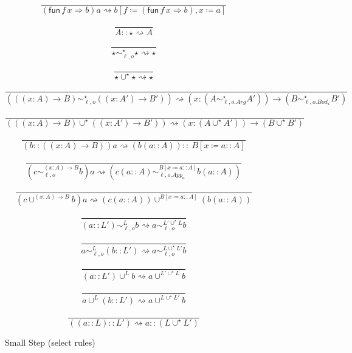 \begin{figure}
\[
\frac{\ }{\left(\mathsf{fun}\,f\,x\Rightarrow b\right)a\rightsquigarrow b\left[f\coloneqq\left(\mathsf{fun}\,f\,x\Rightarrow b\right),x\coloneqq a\right]}
\]

\[
\frac{\ }{A::\star\rightsquigarrow A}
\]

\[
\frac{\ }{\star\sim_{\ell,o}^{\star}\star\rightsquigarrow\star}
\]

\[
\frac{\ }{\star\cup^{\star}\star\rightsquigarrow\star}
\]

\[
\frac{\ }{\left(\left(\left(x:A\right)\rightarrow B\right)\sim_{\ell,o}^{\star}\left(\left(x:A'\right)\rightarrow B'\right)\right)\rightsquigarrow\left(x:\left(A\sim_{\ell,o.Arg}^{\star}A'\right)\right)\rightarrow\left(B\sim_{\ell,o.Bod_{x}}^{\star}B'\right)}
\]

\[
\frac{\ }{\left(\left(\left(x:A\right)\rightarrow B\right)\cup^{\star}\left(\left(x:A'\right)\rightarrow B'\right)\right)\rightsquigarrow\left(x:\left(A\cup^{\star}A'\right)\right)\rightarrow\left(B\cup^{\star}B'\right)}
\]

\[
\frac{\ }{\left(b::\left(\left(x:A\right)\rightarrow B\right)\right)a\rightsquigarrow\left(b\left(a::A\right)\right)::\ B\left[x\coloneqq a::A\right]}
\]

\[
\frac{\ }{\left(c\sim_{\ell,o}^{\left(x:A\right)\rightarrow B}b\right)a\rightsquigarrow\left(c\left(a::A\right)\sim_{\ell,o.App_{a}}^{B\left[x\coloneqq a::A\right]}b\left(a::A\right)\right)}
\]

\[
\frac{\ }{\left(c\cup^{\left(x:A\right)\rightarrow B}b\right)a\rightsquigarrow\left(c\left(a::A\right)\right)\cup^{B\left[x\coloneqq a::A\right]}\left(b\left(a::A\right)\right)}
\]

\[
\frac{\ }{\left(a::L'\right)\sim_{\ell,o}^{L}b\rightsquigarrow a\sim_{\ell,o}^{L'\cup^{\star}L}b}
\]

\[
\frac{\ }{a\sim_{\ell,o}^{L}\left(b::L'\right)\rightsquigarrow a\sim_{\ell,o}^{L\cup^{\star}L'}b}
\]

\[
\frac{\ }{\left(a::L'\right)\cup^{L}b\rightsquigarrow a\cup^{L'\cup^{\star}L}b}
\]

\[
\frac{\ }{a\cup^{L}\left(b::L'\right)\rightsquigarrow a\cup^{L\cup^{\star}L'}b}
\]

\[
\frac{\ }{\left(\left(a::L\right)::L'\right)\rightsquigarrow a::\left(L\cup^{\star}L'\right)}
\]
\caption{\CLang{} Small Step (select rules)}
\label{fig:cast-data-step}
\end{figure}

